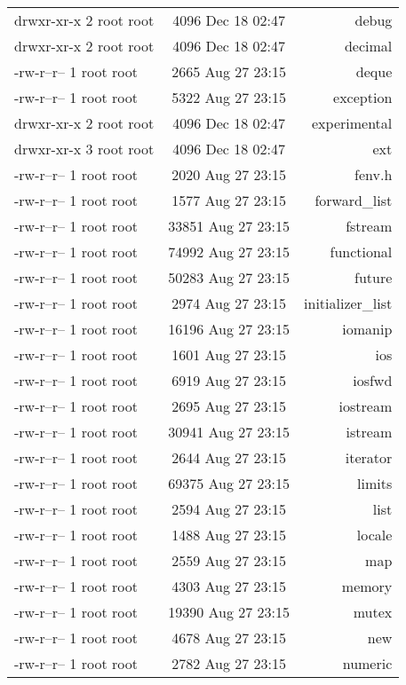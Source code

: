 \documentclass[10pt]{article}
\begin{document}
    \begin{tabular}{|l|c|r|}
    drwxr-xr-x 2 root root &  4096 Dec 18 02:47 & debug\\
    drwxr-xr-x 2 root root &  4096 Dec 18 02:47 & decimal\\
    -rw-r--r-- 1 root root &  2665 Aug 27 23:15 & deque\\
    -rw-r--r-- 1 root root &  5322 Aug 27 23:15 & exception\\
    drwxr-xr-x 2 root root &  4096 Dec 18 02:47 & experimental\\
    drwxr-xr-x 3 root root &  4096 Dec 18 02:47 & ext\\
    -rw-r--r-- 1 root root &  2020 Aug 27 23:15 & fenv.h\\
    -rw-r--r-- 1 root root &  1577 Aug 27 23:15 & forward\_list\\
    -rw-r--r-- 1 root root & 33851 Aug 27 23:15 & fstream\\
    -rw-r--r-- 1 root root & 74992 Aug 27 23:15 & functional\\
    -rw-r--r-- 1 root root & 50283 Aug 27 23:15 & future\\
    -rw-r--r-- 1 root root &  2974 Aug 27 23:15 & initializer\_list\\
    -rw-r--r-- 1 root root & 16196 Aug 27 23:15 & iomanip\\
    -rw-r--r-- 1 root root &  1601 Aug 27 23:15 & ios\\
    -rw-r--r-- 1 root root &  6919 Aug 27 23:15 & iosfwd\\
    -rw-r--r-- 1 root root &  2695 Aug 27 23:15 & iostream\\
    -rw-r--r-- 1 root root & 30941 Aug 27 23:15 & istream\\
    -rw-r--r-- 1 root root &  2644 Aug 27 23:15 & iterator\\
    -rw-r--r-- 1 root root & 69375 Aug 27 23:15 & limits\\
    -rw-r--r-- 1 root root &  2594 Aug 27 23:15 & list\\
    -rw-r--r-- 1 root root &  1488 Aug 27 23:15 & locale\\
    -rw-r--r-- 1 root root &  2559 Aug 27 23:15 & map\\
    -rw-r--r-- 1 root root &  4303 Aug 27 23:15 & memory\\
    -rw-r--r-- 1 root root & 19390 Aug 27 23:15 & mutex\\
    -rw-r--r-- 1 root root &  4678 Aug 27 23:15 & new\\
    -rw-r--r-- 1 root root &  2782 Aug 27 23:15 & numeric\\

\end{tabular}
\end{document}
